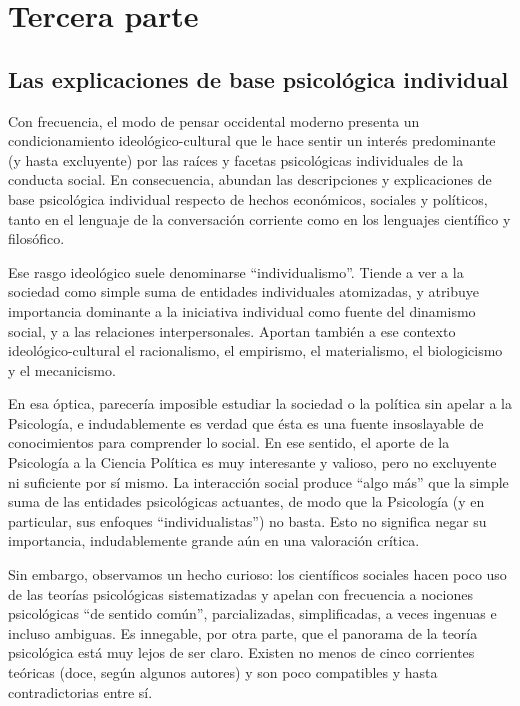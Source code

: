\documentclass[
]{book}
\begin{document}
\hypertarget{tercera-parte-2}{%
\section*{Tercera parte}\label{tercera-parte-2}}

\hypertarget{las-explicaciones-de-base-psicoluxf3gica-individual}{%
\subsection*{Las explicaciones de base psicológica individual}\label{las-explicaciones-de-base-psicoluxf3gica-individual}}

Con frecuencia, el modo de pensar occidental moderno presenta un condicionamiento ideológico-cultural que le hace sentir un interés predominante (y hasta excluyente) por las raíces y facetas psicológicas individuales de la conducta social. En consecuencia, abundan las descripciones y explicaciones de base psicológica individual respecto de hechos económicos, sociales y políticos, tanto en el lenguaje de la conversación corriente como en los lenguajes científico y filosófico.

Ese rasgo ideológico suele denominarse ``individualismo''. Tiende a ver a la sociedad como simple suma de entidades individuales atomizadas, y atribuye importancia dominante a la iniciativa individual como fuente del dinamismo social, y a las relaciones interpersonales. Aportan también a ese contexto ideológico-cultural el racionalismo, el empirismo, el materialismo, el biologicismo y el mecanicismo.

En esa óptica, parecería imposible estudiar la sociedad o la política sin apelar a la Psicología, e indudablemente es verdad que ésta es una fuente insoslayable de conocimientos para comprender lo social. En ese sentido, el aporte de la Psicología a la Ciencia Política es muy interesante y valioso, pero no excluyente ni suficiente por sí mismo. La interacción social produce ``algo más'' que la simple suma de las entidades psicológicas actuantes, de modo que la Psicología (y en particular, sus enfoques ``individualistas'') no basta. Esto no significa negar su importancia, indudablemente grande aún en una valoración crítica.

Sin embargo, observamos un hecho curioso: los científicos sociales hacen poco uso de las teorías psicológicas sistematizadas y apelan con frecuencia a nociones psicológicas ``de sentido común'', parcializadas, simplificadas, a veces ingenuas e incluso ambiguas. Es innegable, por otra parte, que el panorama de la teoría psicológica está muy lejos de ser claro. Existen no menos de cinco corrientes teóricas (doce, según algunos autores) y son poco compatibles y hasta contradictorias entre sí.
\end{document}

